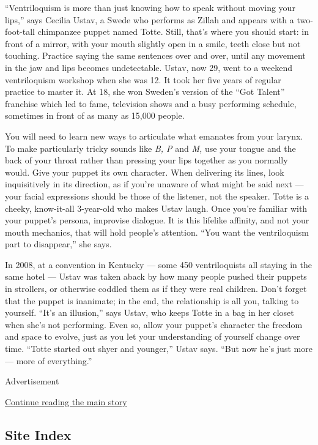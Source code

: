 ``Ventriloquism is more than just knowing how to speak without moving
your lips,'' says Cecilia Ustav, a Swede who performs as Zillah and
appears with a two-foot-tall chimpanzee puppet named Totte. Still,
that's where you should start: in front of a mirror, with your mouth
slightly open in a smile, teeth close but not touching. Practice saying
the same sentences over and over, until any movement in the jaw and lips
becomes undetectable. Ustav, now 29, went to a weekend ventriloquism
workshop when she was 12. It took her five years of regular practice to
master it. At 18, she won Sweden's version of the ``Got Talent''
franchise which led to fame, television shows and a busy performing
schedule, sometimes in front of as many as 15,000 people.

You will need to learn new ways to articulate what emanates from your
larynx. To make particularly tricky sounds like \emph{B, P} and
\emph{M,} use your tongue and the back of your throat rather than
pressing your lips together as you normally would. Give your puppet its
own character. When delivering its lines, look inquisitively in its
direction, as if you're unaware of what might be said next --- your
facial expressions should be those of the listener, not the speaker.
Totte is a cheeky, know-it-all 3-year-old who makes Ustav laugh. Once
you're familiar with your puppet's persona, improvise dialogue. It is
this lifelike affinity, and not your mouth mechanics, that will hold
people's attention. ``You want the ventriloquism part to disappear,''
she says.

In 2008, at a convention in Kentucky --- some 450 ventriloquists all
staying in the same hotel --- Ustav was taken aback by how many people
pushed their puppets in strollers, or otherwise coddled them as if they
were real children. Don't forget that the puppet is inanimate; in the
end, the relationship is all you, talking to yourself. ``It's an
illusion,'' says Ustav, who keeps Totte in a bag in her closet when
she's not performing. Even so, allow your puppet's character the freedom
and space to evolve, just as you let your understanding of yourself
change over time. ``Totte started out shyer and younger,'' Ustav says.
``But now he's just more --- more of everything.''

Advertisement

\protect\hyperlink{after-bottom}{Continue reading the main story}

\hypertarget{site-index}{%
\subsection{Site Index}\label{site-index}}


